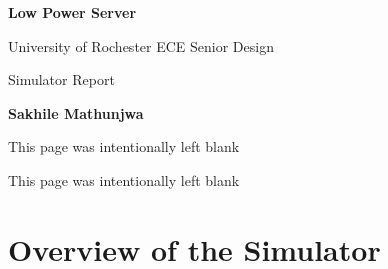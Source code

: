 \documentclass[letterpaper, 11pt, twoside]{article}
\begin{document}
\begin{titlepage}
	\begin{center}

	\vspace*{1cm}
	\Huge
	\textbf{Low Power Server}

	\vspace{0.5cm}
	\LARGE
	University of Rochester ECE Senior Design 

	\vspace{1cm}
	\LARGE
	Simulator Report
	\vspace{1.5cm}
	
	\textbf{Sakhile Mathunjwa} 
	\vfill
	
	
	\end{center}

\end{titlepage}


\clearpage



\begin{center}
	This page was intentionally left blank
\end{center}

\clearpage



\tableofcontents
\setcounter{page}{1}
\clearpage



\begin{center}
This page was intentionally left blank
\end{center}

\clearpage

\section[Overview]{Overview of the Simulator}

\end{document}
